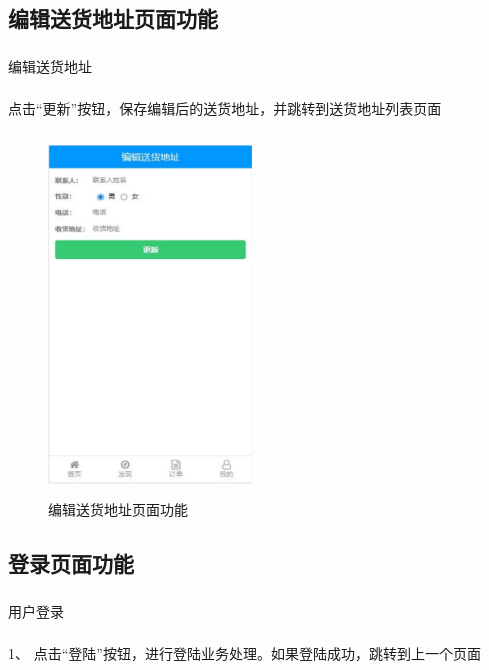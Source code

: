 \subsection{编辑送货地址页面功能}
\subsubsection*{}
编辑送货地址
\subsubsection*{}
点击“更新”按钮，保存编辑后的送货地址，并跳转到送货地址列表页面
\begin{figure}[H]
    \centering
    \includegraphics[width=5.4cm,height=9.6cm]{figures/3.1.8.png}
    \caption{编辑送货地址页面功能}
\end{figure}

\subsection{登录页面功能}
\subsubsection*{}
用户登录
\subsubsection*{}
1、 点击“登陆”按钮，进行登陆业务处理。如果登陆成功，跳转到上一个页面

